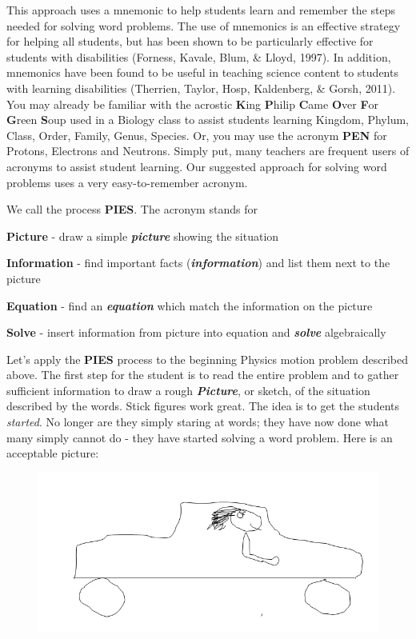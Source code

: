 \documentclass[11.5pt]{sig-alternate} %
\begin{document}
\begin{large}
This approach uses a mnemonic to help students learn and remember the steps needed for solving word problems. The use of mnemonics is an effective strategy for helping all students, but has been shown to be particularly effective for students with disabilities (Forness, Kavale, Blum, \& Lloyd, 1997). In addition, mnemonics have been found to be useful in teaching science content to students with learning disabilities (Therrien, Taylor, Hosp, Kaldenberg, \& Gorsh, 2011). You may already be familiar with the acrostic \textbf{K}ing \textbf{P}hilip \textbf{C}ame \textbf{O}ver \textbf{F}or \textbf{G}reen \textbf{S}oup used in a Biology class to assist students learning Kingdom, Phylum, Class, Order, Family, Genus, Species. Or, you may use the acronym \textbf{PEN} for Protons, Electrons and Neutrons.  Simply put, many teachers are frequent users of acronyms to assist student learning.  Our suggested approach for solving word problems uses a very easy-to-remember acronym. 

We call the process \textbf{PIES}. The acronym stands for

\textbf{Picture} - draw a simple \textbf{\textit{picture}} showing the situation

\textbf{Information} - find important facts (\textbf{\textit{information}}) and list them next to the picture

\textbf{Equation} - find an \textbf{\textit{equation}} which match the information on the picture

\textbf{Solve} - insert information from picture into equation and \textbf{\textit{solve}} algebraically

Let's apply the \textbf{PIES} process to the beginning Physics motion problem described above.  The first step for the student is to read the entire problem and to gather sufficient information to draw a rough \textbf{\textit{Picture}}, or sketch, of the situation described by the words.  Stick figures work great.  The idea is to get the students \textit{started}.  No longer are they simply staring at words; they have now done what many simply cannot do - they have started solving a word problem.  Here is an acceptable picture:

\begin{figure}[h]
    \centering
    \includegraphics[width=1\linewidth]{img1.jpg}
\end{figure}


\end{large}
\end{document}
